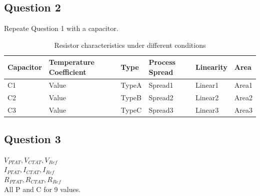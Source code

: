 \documentclass[a4paper]{article}
\begin{document}
\subsection{Question 2}
Repeate Question 1 with a capacitor. 
\begin{table}[ht]
\centering
\begin{tabular}{|l|l|l|l|l|l|}
\hline
Capacitor & Temperature Coefficient & Type & Process Spread & Linearity & Area \\
\hline
C1 & Value & TypeA & Spread1 & Linear1 & Area1 \\
C2 & Value & TypeB & Spread2 & Linear2 & Area2 \\
C3 & Value & TypeC & Spread3 & Linear3 & Area3 \\
\hline
\end{tabular}
\caption{Resistor characteristics under different conditions}
\end{table}

\subsection{Question 3}
$V_{PTAT}, V_{CTAT}, V_{Ref}$\\ $I_{PTAT}, I_{CTAT}, I_{Ref}$\\ $R_{PTAT}, R_{CTAT}, R_{Ref}$\\
All P and C for 9 values.
\end{document}
